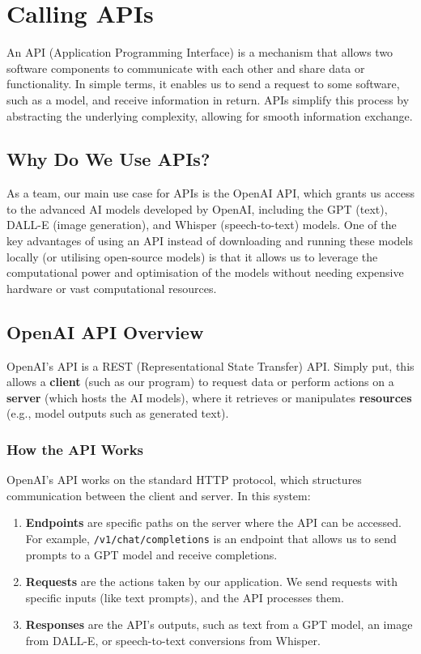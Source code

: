 \documentclass[
  letterpaper,
  DIV=11,
  numbers=noendperiod]{scrreprt}
\begin{document}
\chapter{Calling APIs}\label{calling-apis}

An API (Application Programming Interface) is a mechanism that allows
two software components to communicate with each other and share data or
functionality. In simple terms, it enables us to send a request to some
software, such as a model, and receive information in return. APIs
simplify this process by abstracting the underlying complexity, allowing
for smooth information exchange.

\section{Why Do We Use APIs?}\label{why-do-we-use-apis}

As a team, our main use case for APIs is the OpenAI API, which grants us
access to the advanced AI models developed by OpenAI, including the GPT
(text), DALL-E (image generation), and Whisper (speech-to-text) models.
One of the key advantages of using an API instead of downloading and
running these models locally (or utilising open-source models) is that
it allows us to leverage the computational power and optimisation of the
models without needing expensive hardware or vast computational
resources.

\section{OpenAI API Overview}\label{openai-api-overview}

OpenAI's API is a REST (Representational State Transfer) API. Simply
put, this allows a \textbf{client} (such as our program) to request data
or perform actions on a \textbf{server} (which hosts the AI models),
where it retrieves or manipulates \textbf{resources} (e.g., model
outputs such as generated text).

\subsection{How the API Works}\label{how-the-api-works}

OpenAI's API works on the standard HTTP protocol, which structures
communication between the client and server. In this system:

\begin{enumerate}
\def\labelenumi{\arabic{enumi}.}
\item
  \textbf{Endpoints} are specific paths on the server where the API can
  be accessed. For example, \texttt{/v1/chat/completions} is an endpoint
  that allows us to send prompts to a GPT model and receive completions.
\item
  \textbf{Requests} are the actions taken by our application. We send
  requests with specific inputs (like text prompts), and the API
  processes them.
\item
  \textbf{Responses} are the API's outputs, such as text from a GPT
  model, an image from DALL-E, or speech-to-text conversions from
  Whisper.
\end{enumerate}
\end{document}
